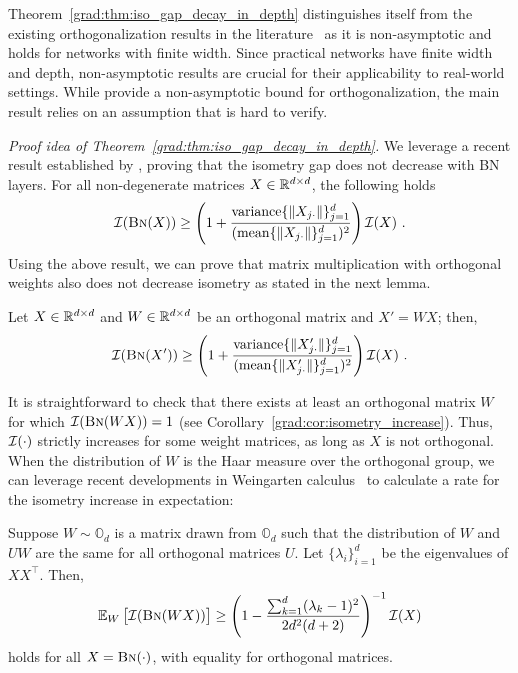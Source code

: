 Theorem~\ref{grad:thm:iso_gap_decay_in_depth} distinguishes itself from the existing orthogonalization results in the literature~\citep{yang2018a,joudaki2023impact} as it is non-asymptotic and holds for networks with finite width. Since practical networks have finite width and depth, non-asymptotic results are crucial for their applicability to real-world settings. While \citet{daneshmand2021batch} provide a non-asymptotic bound for orthogonalization, the main result relies on an assumption that is hard to verify. 


\textit{Proof idea of Theorem~\ref{grad:thm:iso_gap_decay_in_depth}.}
We leverage a recent result established by  \citet{joudaki2023impact}, proving that the isometry gap does not decrease with BN layers. 
For all non-degenerate matrices $X \in \mathbb{R}^{d \times d}$, the following holds
    \begin{align*}
        \mathcal{I}(\text{\sc{Bn}}(X))\geq \left(1+ \frac{\mathrm{variance}\{\|X_{j\cdot}\|\}_{j=1}^d}{(\mathrm{mean} \{\|X_{j\cdot}\|\}_{j=1}^d)^2}\right) \mathcal{I}(X)~.
    \end{align*}
Using the above result, we can prove that matrix multiplication with orthogonal weights also does not decrease isometry as stated in the next lemma. 
\begin{lemma}
\label{grad:lem:iso_rotation}
Let $X \in \mathbb{R}^{d\times d}$ and $W \in \mathbb{R}^{d\times d}$ be an orthogonal matrix and $X' = W X$; then,  
\begin{align}
   \mathcal{I}(\text{\sc{Bn}}(X'))\geq \left(1+ \frac{\mathrm{variance}\{\|X'_{j\cdot}\|\}_{j=1}^d}{(\mathrm{mean} \{\|X'_{j\cdot}\|\}_{j=1}^d)^2}\right) \mathcal{I}(X)~.
\end{align}
\end{lemma}
%
It is straightforward to check that there exists at least an orthogonal matrix $W$ for which $\mathcal{I}(\text{\sc{Bn}}(WX))=1$ (see Corollary~\ref{grad:cor:isometry_increase}). Thus, $\mathcal{I}(\cdot)$ strictly increases for some weight matrices, as long as $X$ is not orthogonal. When the distribution of $W$ is the Haar measure over the orthogonal group, we can leverage recent developments in Weingarten calculus~\citep{weingarten1978asymptotic, banica2011polynomial,collins2006integration,collins2022weingarten} to calculate a rate for the isometry increase in expectation: 
\begin{theorem}
    \label{grad:thm:iso_bound}
    Suppose $W \sim \mathbb{O}_d$ is a matrix drawn from $\mathbb{O}_d$ such that the distribution of $W$ and $UW$ are the same for all orthogonal matrices $U$. Let $\{\lambda_i\}_{i=1}^d$ be the eigenvalues of $XX^\top$. Then,
    \begin{align}
        \mathbb{E}_W \left[\mathcal{I}(\text{\sc{Bn}}(WX))\right ] \geq \left( 1 - \frac{\sum_{k=1}^d (\lambda_k - 1)^2}{2d^2(d+2)} \right)^{-1} \mathcal{I}(X)   
    \end{align}
    holds for all $X = \text{\sc{Bn}}(\cdot)$, with equality for orthogonal matrices.
\end{theorem}

